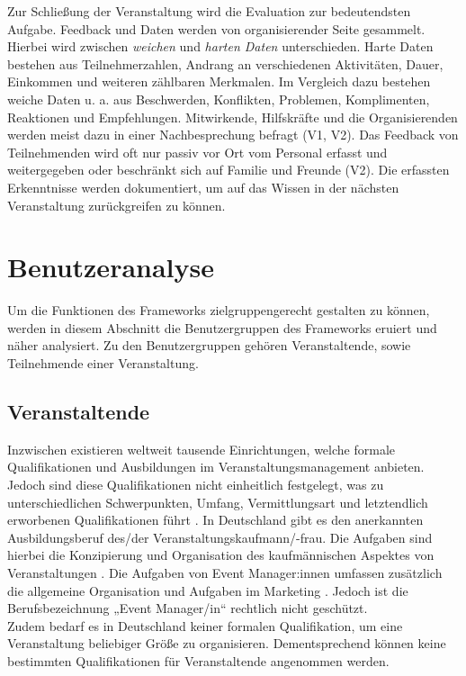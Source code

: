 Zur Schließung der Veranstaltung wird die Evaluation zur bedeutendsten Aufgabe.
Feedback und Daten werden von organisierender Seite gesammelt. Hierbei wird
zwischen \textit{weichen} und \textit{harten Daten} unterschieden. Harte Daten
bestehen aus Teilnehmerzahlen, Andrang an verschiedenen Aktivitäten, Dauer,
Einkommen und weiteren zählbaren Merkmalen. Im Vergleich dazu bestehen weiche
Daten u. a. aus Beschwerden, Konflikten, Problemen, Komplimenten, Reaktionen und
Empfehlungen. Mitwirkende, Hilfskräfte und die Organisierenden werden meist dazu
in einer Nachbesprechung befragt (V1, V2). Das Feedback von Teilnehmenden wird
oft nur passiv vor Ort vom Personal erfasst und weitergegeben oder beschränkt
sich auf Familie und Freunde (V2). Die erfassten Erkenntnisse werden
dokumentiert, um auf das Wissen in der nächsten Veranstaltung zurückgreifen zu
können.


\section{Benutzeranalyse} \label{sec:analysis-user}

Um die Funktionen des Frameworks zielgruppengerecht gestalten zu können, werden
in diesem Abschnitt die Benutzergruppen des Frameworks eruiert und näher
analysiert. Zu den Benutzergruppen gehören Veranstaltende, sowie Teilnehmende
einer Veranstaltung.

\subsection{Veranstaltende} \label{ssec:analysis-user-v}

Inzwischen existieren weltweit tausende Einrichtungen, welche formale
Qualifikationen und Ausbildungen im Veranstaltungsmanagement anbieten. Jedoch
sind diese Qualifikationen nicht einheitlich festgelegt, was zu
unterschiedlichen Schwerpunkten, Umfang, Vermittlungsart und letztendlich
erworbenen Qualifikationen führt \cite{Bladen2012}. In Deutschland gibt es den
anerkannten Ausbildungsberuf des/der Veranstaltungs\-kaufmann/-frau. Die
Aufgaben sind hierbei die Konzipierung und Organisation des kaufmännischen
Aspektes von Veranstaltungen \cite{Kultusministerkonferenz2001}. Die Aufgaben
von Event Manager:innen umfassen zusätzlich die allgemeine Organisation und
Aufgaben im Marketing \cite{BundesagenturfurArbeit2021}. Jedoch ist die
Berufsbezeichnung „Event Manager/in“ rechtlich nicht geschützt. \\
Zudem bedarf es in Deutschland keiner formalen Qualifikation, um eine
Veranstaltung beliebiger Größe zu organisieren. Dementsprechend können keine
bestimmten Qualifikationen für Veranstaltende angenommen werden.

